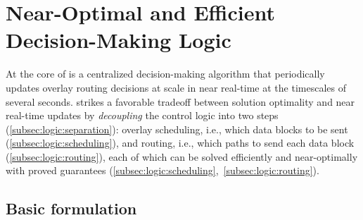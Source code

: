 \section{Near-Optimal and Efficient Decision-Making Logic}
\label{sec:logic}

At the core of \name is a centralized decision-making
algorithm that periodically updates overlay
routing decisions at scale  in near real-time at the timescales of several seconds.
\name strikes a favorable tradeoff between solution optimality
and near real-time updates by
{\em decoupling} the control logic into two steps (\Section\ref{subsec:logic:separation}):
overlay scheduling, i.e., which data blocks to be sent
(\Section\ref{subsec:logic:scheduling}),
and routing, i.e., which paths to send each data block
(\Section\ref{subsec:logic:routing}), each of which
can be solved efficiently and near-optimally with proved guarantees
(\Section\ref{subsec:logic:scheduling},~\ref{subsec:logic:routing}).



\subsection{Basic formulation}
\label{subsec:logic:formulation}

